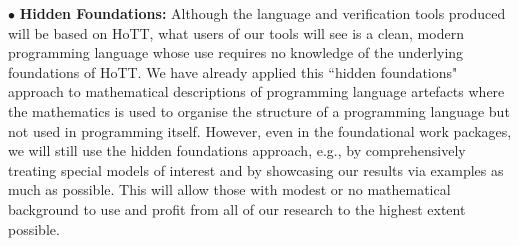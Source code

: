 \documentclass[a4paper,11pt]{article}
\begin{document}
\vspace*{0.02in}


$\bullet$ {\bf Hidden Foundations:} Although the language and
verification tools produced will be based on HoTT, what users of our
tools will see is a clean, modern programming language whose use
requires no knowledge of the underlying foundations of HoTT. We have
already applied this ``hidden foundations" approach to mathematical
descriptions of programming language artefacts where the mathematics
is used to organise the structure of a programming language but not
used in programming itself. However, even in the foundational work
packages, we will still use the hidden foundations approach, e.g., by
comprehensively treating special models of interest and by showcasing
our results via examples as much as possible. This will allow those
with modest or no mathematical background to use and profit from
all of our research to the highest extent possible.




\vspace{-0.15in}
\end{document}
